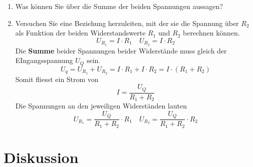 \begin{enumerate}[$a)$]
\item Was können Sie über die Summe der beiden Spannungen aussagen?
\item Versuchen Sie eine Beziehung herzuleiten, mit der sie die Spannung über $R_2$ als Funktion der beiden Widerstandswerte $R_1$ und $R_2$ berechnen können.
\begin{equation*}
\boxed{U_{R_1}=I\cdot R_{1}} \quad \boxed{U_{R_2}=I\cdot R_{2}}
\end{equation*}
Die \textbf{Summe} beider Spannungen beider Widerstände muss gleich der EIngangsspannung $U_Q$ sein. 
\begin{equation*}
U_{q}=U_{R_1}+U_{R_2}=I\cdot R_1+I\cdot R_2=I\cdot \left(R_1+R_2\right)
\end{equation*}
Somit fliesst ein Strom von
\begin{equation*}
I=\dfrac{U_Q}{R_1+R_2}
\end{equation*}
Die Spannungen an den jeweiligen Widerständen lauten
\begin{equation}
\boxed{U_{R_1}=\dfrac{U_Q}{R_1+R_2}\cdot R_1}\quad \boxed{U_{R_2}=\dfrac{U_Q}{R_1+R_2}\cdot R_2}
\end{equation}
\end{enumerate}
\section{Diskussion}
